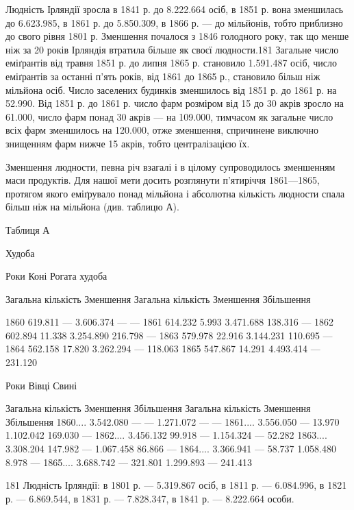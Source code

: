 Людність Ірляндії зросла в 1841 р. до 8.222.664 осіб, в 1851 р.
вона зменшилась до 6.623.985, в 1861 р. до 5.850.309, в 1866 р. —
до  мільйонів, тобто приблизно до свого рівня 1801 р. Зменшення
почалося з 1846 голодного року, так що менше ніж за
20 років Ірляндія втратила більше як  своєї людности.181
Загальне число еміґрантів від травня 1851 р. до липня 1865 р.
становило 1.591.487 осіб, число еміґрантів за останні п’ять років,
від 1861 до 1865 р., становило більш ніж  мільйона осіб. Число
заселених будинків зменшилось від 1851 р. до 1861 р. на 52.990.
Від 1851 р. до 1861 р. число фарм розміром від 15 до 30 акрів зросло
на 61.000, число фарм понад 30 акрів — на 109.000, тимчасом
як загальне число всіх фарм зменшилось на 120.000, отже зменшення,
спричинене виключно знищенням фарм нижче 15 акрів,
тобто централізацією їх.

Зменшення людности, певна річ взагалі і в цілому супроводилось
зменшенням маси продуктів. Для нашої мети досить
розглянути п’ятиріччя 1861—1865, протягом якого еміґрувало
понад  мільйона і абсолютна кількість людности спала
більш ніж на  мільйона (див. таблицю А).

Таблиця А

Худоба

Роки    Коні    Рогата худоба

    Загальна кількість    Зменшення    Загальна кількість    Зменшення    Збільшення

1860                619.811              —                    3.606.374                       —     
                 —
1861                614.232           5.993                 3.471.688                 138.316       
          —
1862                602.894          11.338                3.254.890                 216.798        
         —
1863                579.978          22.916                3.144.231                 110.695        
         —
1864                562.158          17.820                3.262.294                       —        
        118.063
1865                547.867          14.291                4.493.414                       —        
         231.120

Роки    Вівці            Свині

    Загальна кількість    Зменшення    Збільшення    Загальна кількість    Зменшення    Збільшення
1860....    3.542.080         —                   —              1.271.072          —               
      —
1861....    3.556.050         —               13.970         1.102.042       169.030               —
1862....    3.456.132      99.918             —              1.154.324         —                  
52.282
1863....    3.308.204     147.982            —              1.067.458        86.866                —
1864....    3.366.941        —                58.737         1.058.480       8.978                  
—
1865....    3.688.742        —                321.801       1.299.893         —                
241.413

181 Людність Ірляндії: в 1801 р. — 5.319.867 осіб, в 1811 р. — 6.084.996,
в 1821 р. — 6.869.544, в 1831 р. — 7.828.347, в 1841 р. — 8.222.664 особи.
